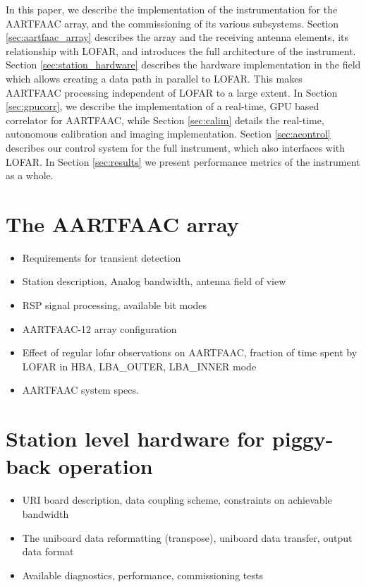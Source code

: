 \documentclass{aa}
\begin{document}
In this  paper, we describe  the implementation  of the instrumentation  for the
AARTFAAC  array,  and the  commissioning  of  its various  subsystems.   Section
\ref{sec:aartfaac_array} describes the array and the receiving antenna elements,
its  relationship  with LOFAR,  and  introduces  the  full architecture  of  the
instrument.    Section   \ref{sec:station_hardware}   describes   the   hardware
implementation in  the field which  allows creating a  data path in  parallel to
LOFAR. This  makes AARTFAAC processing independent  of LOFAR to a  large extent.
In Section \ref{sec:gpucorr}, we describe the implementation of a real-time, GPU
based  correlator  for  AARTFAAC,  while  Section  \ref{sec:calim}  details  the
real-time,   autonomous  calibration   and   imaging  implementation.    Section
\ref{sec:acontrol} describes our  control system for the  full instrument, which
also interfaces with LOFAR.  In Section \ref{sec:results} we present performance
metrics of the instrument as a whole.

\section {\label{sec:aartfaac_array}The AARTFAAC array}
\begin {itemize}
 \item {Requirements for transient detection}
 \item {Station description, Analog bandwidth, antenna field of view}
 \item {RSP signal processing, available bit modes}
 \item {AARTFAAC-12 array configuration}
 \item {Effect of regular lofar observations on AARTFAAC, fraction of time spent
   by LOFAR in HBA, LBA\_OUTER, LBA\_INNER mode}
 \item {AARTFAAC system specs.}
\end {itemize}

\section {\label{sec:station_hardware} Station level hardware for piggy-back operation}
\begin {itemize}
 \item {URI board  description, data coupling scheme,  constraints on achievable
   bandwidth}
 \item  {The uniboard  data  reformatting (transpose),  uniboard data  transfer,
   output data format}
 \item {Available diagnostics, performance, commissioning tests}
\end{itemize}
\end{document}
